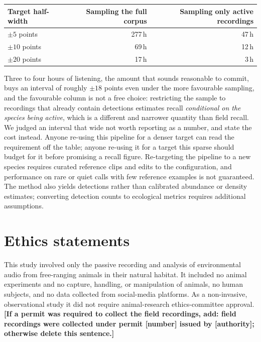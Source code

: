 \documentclass[review,3p,times]{elsarticle}
\begin{document}
\begin{center}
\begin{tabular}{lrr}
\toprule
Target half-width & Sampling the full corpus & Sampling only active recordings \\
\midrule
$\pm5$ points  & 277\,h & 47\,h \\
$\pm10$ points &  69\,h & 12\,h \\
$\pm20$ points &  17\,h &  3\,h \\
\bottomrule
\end{tabular}
\end{center}

Three to four hours of listening, the amount that sounds reasonable to commit,
buys an interval of roughly $\pm18$ points even under the more favourable
sampling, and the favourable column is not a free choice: restricting the sample
to recordings that already contain detections estimates recall \emph{conditional
on the species being active}, which is a different and narrower quantity than
field recall. We judged an interval that wide not worth reporting as a number,
and state the cost instead. Anyone re-using this pipeline for a denser target
can read the requirement off the table; anyone re-using it for a target this
sparse should budget for it before promising a recall figure.
Re-targeting the pipeline to a new species requires curated reference clips and
edits to the configuration, and performance on rare or quiet calls with few
reference examples is not guaranteed. The method also yields detections rather
than calibrated abundance or density estimates; converting detection counts to
ecological metrics requires additional assumptions.

\section*{Ethics statements}

This study involved only the passive recording and analysis of environmental
audio from free-ranging animals in their natural habitat. It included no
animal experiments and no capture, handling, or manipulation of animals, no
human subjects, and no data collected from social-media platforms. As a
non-invasive, observational study it did not require animal-research
ethics-committee approval. \textbf{[If a permit was required to collect the
field recordings, add: field recordings were collected under permit [number]
issued by [authority]; otherwise delete this sentence.]}
\end{document}

